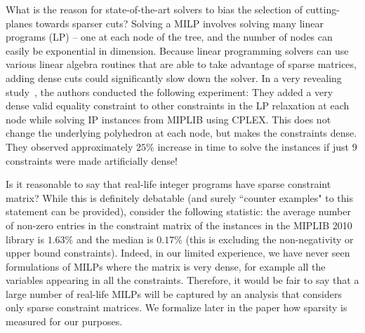 \documentclass[smallextended]{svjour3}
\begin{document}
What is the reason for state-of-the-art solvers to bias the selection of cutting-planes towards sparser cuts? Solving a MILP involves solving many linear programs (LP) -- one at each node of the tree, and the number of nodes can easily be exponential in dimension. Because linear programming solvers can use various linear algebra routines that are able to take advantage of sparse matrices, adding dense cuts could significantly slow down the solver. In a very revealing study~\cite{Walter14}, the authors conducted the following experiment: They added a very dense valid equality constraint to other constraints in the LP relaxation at each node while solving IP instances from MIPLIB using CPLEX. This does not change the underlying polyhedron at each node, but makes the constraints dense. They observed approximately $25\%$ increase in time to solve the instances if just $9$ constraints were made artificially dense!

Is it reasonable to say that real-life integer programs have sparse constraint matrix? While this is definitely debatable (and surely ``counter examples" to this statement can be provided), consider the following statistic: the average number of non-zero entries in the constraint matrix of the instances in the MIPLIB 2010 library is $1.63\%$ and the median is $0.17\%$ (this is excluding the non-negativity or upper bound constraints). Indeed, in our limited experience, we have never seen formulations of MILPs where the matrix is very dense, for example all the variables appearing in all the constraints. Therefore, it would be fair to say that a large number of real-life MILPs will be captured by an analysis that considers only sparse constraint matrices. We  formalize later in the paper how sparsity is measured for our purposes.
\end{document}

